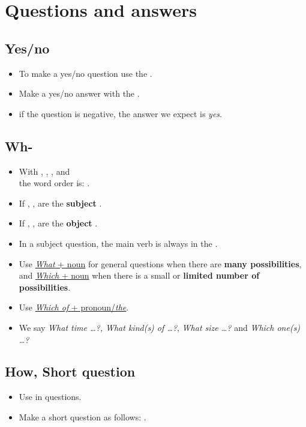 \section{Questions and answers}

\subsection{Yes/no}
\begin{itemize}
    \item To make a yes/no question use the .
    \item Make a yes/no answer with the .
    \item[\aast] if the question is negative, the answer we expect is \textit{yes}.
\end{itemize}

\subsection{Wh-}
\begin{itemize}
    \item With , , ,  and \\
    the word order is: .
    \item If , ,  are the \textbf{subject} .
    \item If , ,  are the \textbf{object} .
    \item In a subject question, the main verb is always in the .
    \item Use \underline{\textit{What} + noun} for general questions when there are \textbf{many possibilities},
    and \underline{\textit{Which} + noun} when there is a small or \textbf{limited number of possibilities}.
    \item Use \underline{\textit{Which of} + pronoun/\textit{the}}.
    \item We say \textit{What time \ldots?, What kind(s) of \ldots?},
    \textit{What size \ldots?} and \textit{Which one(s) \ldots?}
\end{itemize}

\subsection{How, Short question}
\begin{itemize}
    \item Use  in questions.
    \item[\doot] Make a short question as follows: .
\end{itemize}

